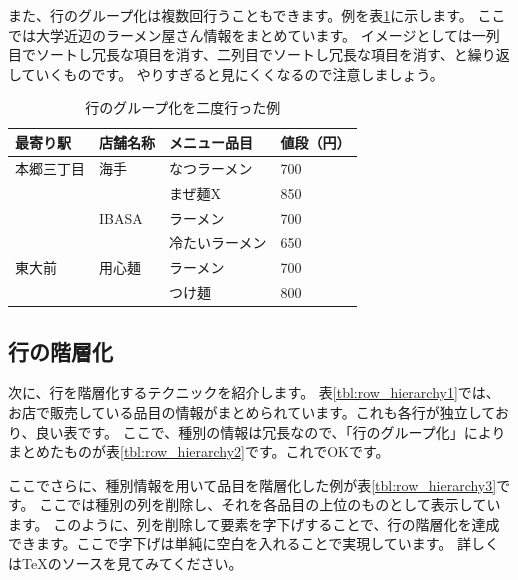 \documentclass[uplatex,onecolumn,9pt,dvipdfmx]{jsarticle}
\newcommand{\Tref}[1]{表\ref{#1}}
\begin{document}
また、行のグループ化は複数回行うこともできます。例を\Tref{tbl:row_group4}に示します。
ここでは大学近辺のラーメン屋さん情報をまとめています。
イメージとしては一列目でソートし冗長な項目を消す、二列目でソートし冗長な項目を消す、と繰り返していくものです。
やりすぎると見にくくなるので注意しましょう。

\begin{table}[h]
    \centering
    \begin{tabular}{@{}llll@{}} \toprule
        最寄り駅 & 店舗名称 & メニュー品目 & 値段（円） \\ \midrule
        本郷三丁目 & 海手 & なつラーメン & 700 \\
                  &     & まぜ麺X & 850 \\
                  & IBASA & ラーメン & 700 \\
                  &       & 冷たいラーメン & 650 \\
        東大前  & 用心麺 & ラーメン & 700  \\ 
              &         & つけ麺 & 800  \\ \bottomrule   
    \end{tabular}
    \caption{行のグループ化を二度行った例}
    \label{tbl:row_group4}
\end{table}


\subsection{行の階層化}

次に、行を階層化するテクニックを紹介します。
\Tref{tbl:row_hierarchy1}では、お店で販売している品目の情報がまとめられています。これも各行が独立しており、良い表です。
ここで、種別の情報は冗長なので、「行のグループ化」によりまとめたものが\Tref{tbl:row_hierarchy2}です。これでOKです。

ここでさらに、種別情報を用いて品目を階層化した例が\Tref{tbl:row_hierarchy3}です。
ここでは種別の列を削除し、それを各品目の上位のものとして表示しています。
このように、列を削除して要素を字下げすることで、行の階層化を達成できます。ここで字下げは単純に空白を入れることで実現しています。
詳しくはTeXのソースを見てみてください。
\end{document}
